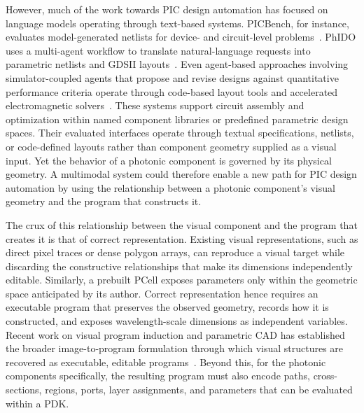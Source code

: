 \documentclass[%
 reprint,
 superscriptaddress,
 amsmath,amssymb,
 aps,
 pra,
 longbibliography,
 floatfix,
]{revtex4-2}
\begin{document}
However, much of the work towards PIC design automation has focused on
language models operating through text-based systems. PICBench, for
instance, evaluates model-generated netlists for device- and circuit-level
problems~\cite{picbench}. PhIDO uses a multi-agent workflow to translate
natural-language requests into parametric netlists and GDSII
layouts~\cite{phido}. Even agent-based approaches involving
simulator-coupled agents that propose and revise designs against quantitative
performance criteria operate through code-based layout tools and accelerated
electromagnetic solvers~\cite{agentic,tidy3d}. These
systems support circuit assembly and optimization within named component
libraries or predefined parametric design spaces. Their evaluated interfaces
operate through textual specifications, netlists, or code-defined layouts
rather than component geometry supplied as a visual input. Yet the behavior
of a photonic component is governed by its physical geometry. A multimodal
system could therefore enable a new path for PIC design automation by using
the relationship between a photonic component's visual geometry and the
program that constructs it.

The crux of this relationship between the visual component and the program
that creates it is that of correct representation. Existing visual
representations, such as direct pixel traces or dense polygon arrays, can
reproduce a visual target while discarding the constructive relationships
that make its dimensions independently editable. Similarly, a prebuilt PCell
exposes parameters only within the geometric space anticipated by its author.
Correct representation hence requires an executable program that preserves
the observed geometry, records how it is constructed, and exposes
wavelength-scale dimensions as independent variables. Recent work on visual
program induction and parametric CAD has established the broader
image-to-program formulation through which visual structures are recovered as
executable, editable programs~\cite{chaudhuri,ellis2018,cadcrafter}. Beyond
this, for the photonic components specifically, the resulting program must
also encode paths, cross-sections, regions, ports, layer assignments, and
parameters that can be evaluated within a PDK.
\end{document}
